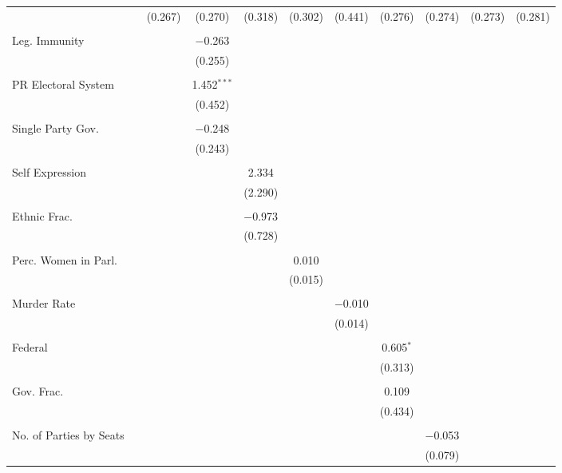\documentclass[a4paper]{article}\usepackage[]{graphicx}\usepackage[]{color}
\begin{document}
\begin{table}
\begin{center}
{{\begin{tabular}{@{\extracolsep{5pt}}lcccccccccc}
  &  & (0.267) & (0.270) & (0.318) & (0.302) & (0.441) & (0.276) & (0.274) & (0.273) & (0.281) \\ 
  & & & & & & & & & & \\ 
 Leg. Immunity &  &  & $-$0.263 &  &  &  &  &  &  &  \\ 
  &  &  & (0.255) &  &  &  &  &  &  &  \\ 
  & & & & & & & & & & \\ 
 PR Electoral System &  &  & 1.452$^{***}$ &  &  &  &  &  &  &  \\ 
  &  &  & (0.452) &  &  &  &  &  &  &  \\ 
  & & & & & & & & & & \\ 
 Single Party Gov. &  &  & $-$0.248 &  &  &  &  &  &  &  \\ 
  &  &  & (0.243) &  &  &  &  &  &  &  \\ 
  & & & & & & & & & & \\ 
 Self Expression &  &  &  & 2.334 &  &  &  &  &  &  \\ 
  &  &  &  & (2.290) &  &  &  &  &  &  \\ 
  & & & & & & & & & & \\ 
 Ethnic Frac. &  &  &  & $-$0.973 &  &  &  &  &  &  \\ 
  &  &  &  & (0.728) &  &  &  &  &  &  \\ 
  & & & & & & & & & & \\ 
 Perc. Women in Parl. &  &  &  &  & 0.010 &  &  &  &  &  \\ 
  &  &  &  &  & (0.015) &  &  &  &  &  \\ 
  & & & & & & & & & & \\ 
 Murder Rate &  &  &  &  &  & $-$0.010 &  &  &  &  \\ 
  &  &  &  &  &  & (0.014) &  &  &  &  \\ 
  & & & & & & & & & & \\ 
 Federal &  &  &  &  &  &  & 0.605$^{*}$ &  &  &  \\ 
  &  &  &  &  &  &  & (0.313) &  &  &  \\ 
  & & & & & & & & & & \\ 
 Gov. Frac. &  &  &  &  &  &  & 0.109 &  &  &  \\ 
  &  &  &  &  &  &  & (0.434) &  &  &  \\ 
  & & & & & & & & & & \\ 
 No. of Parties by Seats &  &  &  &  &  &  &  & $-$0.053 &  &  \\ 
  &  &  &  &  &  &  &  & (0.079) &  &  \\ 

\end{tabular}}}
\end{center}
\end{table}
\end{document}
